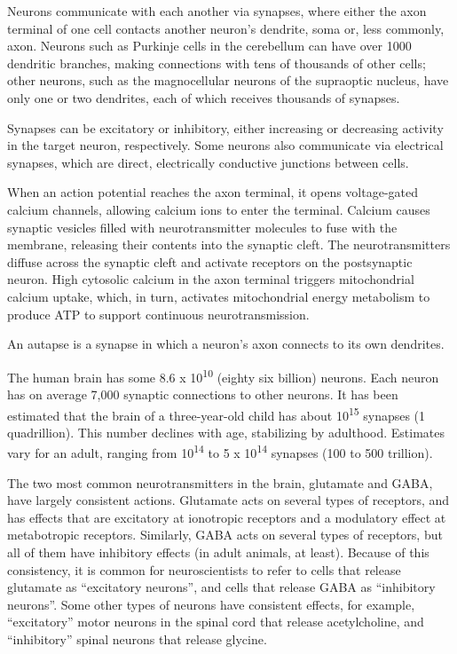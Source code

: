 Neurons communicate with each another via synapses, where either the axon terminal of one cell contacts another neuron's dendrite, soma or, less commonly, axon. Neurons such as Purkinje cells in the cerebellum can have over 1000 dendritic branches, making connections with tens of thousands of other cells; other neurons, such as the magnocellular neurons of the supraoptic nucleus, have only one or two dendrites, each of which receives thousands of synapses.

Synapses can be excitatory or inhibitory, either increasing or decreasing activity in the target neuron, respectively. Some neurons also communicate via electrical synapses, which are direct, electrically conductive junctions between cells.

When an action potential reaches the axon terminal, it opens voltage-gated calcium channels, allowing calcium ions to enter the terminal. Calcium causes synaptic vesicles filled with neurotransmitter molecules to fuse with the membrane, releasing their contents into the synaptic cleft. The neurotransmitters diffuse across the synaptic cleft and activate receptors on the postsynaptic neuron. High cytosolic calcium in the axon terminal triggers mitochondrial calcium uptake, which, in turn, activates mitochondrial energy metabolism to produce ATP to support continuous neurotransmission.

An autapse is a synapse in which a neuron's axon connects to its own dendrites.

The human brain has some 8.6 x 10\textsuperscript{10} (eighty six billion) neurons. Each neuron has on average 7,000 synaptic connections to other neurons. It has been estimated that the brain of a three-year-old child has about 10\textsuperscript{15} synapses (1 quadrillion). This number declines with age, stabilizing by adulthood. Estimates vary for an adult, ranging from 10\textsuperscript{14} to 5 x 10\textsuperscript{14} synapses (100 to 500 trillion).

The two most common neurotransmitters in the brain, glutamate and GABA, have largely consistent actions. Glutamate acts on several types of receptors, and has effects that are excitatory at ionotropic receptors and a modulatory effect at metabotropic receptors. Similarly, GABA acts on several types of receptors, but all of them have inhibitory effects (in adult animals, at least). Because of this consistency, it is common for neuroscientists to refer to cells that release glutamate as ``excitatory neurons'', and cells that release GABA as ``inhibitory neurons''. Some other types of neurons have consistent effects, for example, ``excitatory'' motor neurons in the spinal cord that release acetylcholine, and ``inhibitory'' spinal neurons that release glycine.

